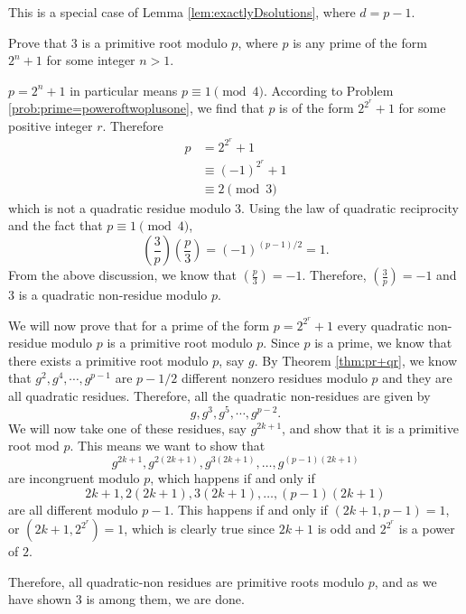 \documentclass{subfile}
\begin{document}
	\begin{solution}[2]
		This is a special case of Lemma \ref{lem:exactlyDsolutions}, where $d=p-1$.
	\end{solution}

	\begin{problem}
		Prove that $3$ is a primitive root modulo $p$, where $p$ is any prime of the form $2^n+1$ for some integer $n>1$.
	\end{problem}

	\begin{solution}[1]
		$p=2^n+1$ in particular means $p \equiv 1 \pmod{4}$.
		According to Problem \ref{prob:prime=poweroftwoplusone}, we find that $p$ is of the form $2^{2^r} + 1$ for some positive integer $r$. Therefore
			\begin{align*}
				p
					& = 2^{2^{r}} +1\\
					& \equiv (-1)^{2^r} +1\\
					& \equiv 2 \pmod{3}
			\end{align*}
		which is not a quadratic residue modulo $3$.
		Using the law of quadratic reciprocity and the fact that $p \equiv 1 \pmod{4}$,
		\[\left(\dfrac{3}{p}\right) \left(\dfrac{p}{3}\right) = (-1)^{(p-1)/2} =1.\] From the above discussion, we know that $\left( \frac{p}{3} \right) = -1$. Therefore, $\left(\frac{3}{p}\right)=-1$ and $3$ is a quadratic non-residue modulo $p$.

		We will now prove that for a prime of the form $p=2^{2^{r}}+1$ every quadratic non-residue modulo $p$ is a primitive root modulo $p$. Since $p$ is a prime, we know that there exists a primitive root modulo $p$, say $g$. By Theorem \ref{thm:pr+qr}, we know that $g^2,g^4,\cdots,g^{p-1}$ are ${p-1}/{2}$ different nonzero residues modulo $p$ and they are all quadratic residues. Therefore, all the quadratic non-residues are given by $$g,g^3,g^5,\cdots,g^{p-2}.$$
		We will now take one of these residues, say $g^{2k+1}$, and show that it is a primitive root mod ${p}$. This means we want to show that $$g^{2k+1},g^{2(2k+1)},g^{3(2k+1)},\ldots,g^{(p-1)(2k+1)}$$ are incongruent modulo $p$, which  happens if and only if $$2k+1,2(2k+1),3(2k+1),\ldots,(p-1)(2k+1)$$ are all different modulo ${p-1}$. This happens if and only if $(2k+1,p-1)=1$, or $(2k+1,2^{2^r})=1$, which is clearly true since $2k+1$ is odd and $2^{2^{r}}$ is a power of $2$.

		Therefore, all quadratic-non residues are primitive roots modulo $p$, and as we have shown $3$ is among them, we are done.
	\end{solution}
\end{document}
